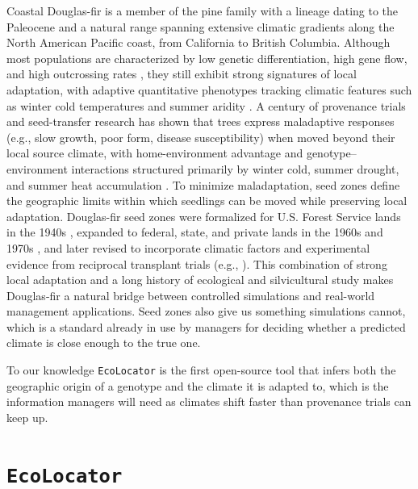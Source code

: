 \documentclass[]{article}
\newcommand{\dfir}{Douglas-fir\xspace}
\newcommand{\ecolocator}{\texttt{EcoLocator}\xspace}
\begin{document}
Coastal \dfir is a member of the pine family
with a lineage dating to the Paleocene \citep{hermann_genus_1985}
and a natural range spanning extensive climatic
gradients along the North American Pacific coast, from California
to British Columbia. Although most populations are characterized by
low genetic differentiation, high gene flow, and high outcrossing rates \citep{slavov_pollen_2005},
they still exhibit strong signatures of local adaptation,
with adaptive quantitative phenotypes tracking climatic features
such as winter cold temperatures and summer aridity \citep{stclair_genecology_2005}.
A century of provenance trials and seed-transfer research
has shown that trees express maladaptive responses
(e.g., slow growth, poor form, disease susceptibility)
when moved beyond their local source climate,
with home-environment advantage and genotype--environment interactions
structured primarily by winter cold, summer drought,
and summer heat accumulation
\citep{stclair_1912_2020, stclair_genecology_2005, stclair_genetic_2007}.
To minimize maladaptation, seed zones define the geographic limits
within which seedlings can be moved while preserving local adaptation.
\dfir seed zones were formalized for U.S. Forest Service lands
in the 1940s \citep{kummel_forest_1944},
expanded to federal, state, and private lands
in the 1960s and 1970s \citep{usdaforestservice_tree_1973},
and later revised to incorporate climatic factors
and experimental evidence from reciprocal transplant trials
(e.g., \citealp{randall_forest_1996, stclair_seedlot_2022}).
This combination of strong local adaptation and a long history
of ecological and silvicultural study
makes \dfir a natural bridge
between controlled simulations and real-world management applications. %
Seed zones also give us something simulations cannot,
which is a standard already in use by managers
for deciding whether a predicted climate is close enough to the true one.

To our knowledge \ecolocator is the first open-source tool
that infers both the geographic origin of a genotype
and the climate it is adapted to,
which is the information managers will need
as climates shift faster than provenance trials can keep up.

\section{\ecolocator}
\end{document}
